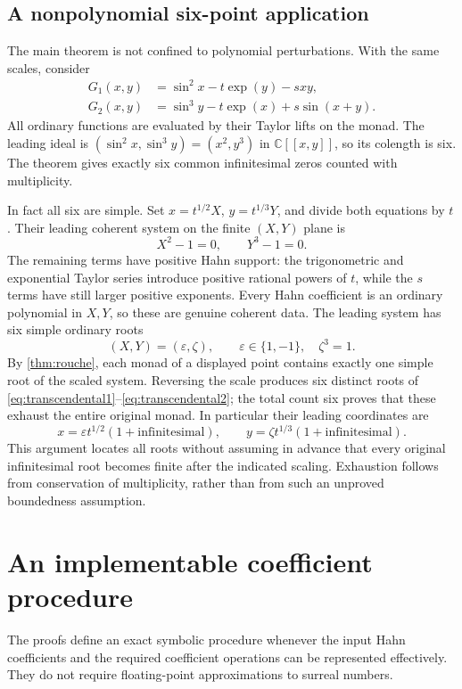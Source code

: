 \documentclass[11pt,letterpaper]{article}
\theoremstyle{definition}
\theoremstyle{remark}
\newcommand{\C}{\mathbb C}
\numberwithin{equation}{section}
\begin{document}
\subsection{A nonpolynomial six-point application}
The main theorem is not confined to polynomial perturbations. With the same scales, consider
\begin{align}
 G_1(x,y)&=\sin^2x-t\exp(y)-sxy,\label{eq:transcendental1}\\
 G_2(x,y)&=\sin^3y-t\exp(x)+s\sin(x+y).\label{eq:transcendental2}
\end{align}
All ordinary functions are evaluated by their Taylor lifts on the monad. The leading ideal is $(\sin^2x,\sin^3y)=(x^2,y^3)$ in $\C[[x,y]]$, so its colength is six. The theorem gives exactly six common infinitesimal zeros counted with multiplicity.

In fact all six are simple. Set $x=t^{1/2}X$, $y=t^{1/3}Y$, and divide both equations by $t$. Their leading coherent system on the finite $(X,Y)$ plane is
\[
 X^2-1=0,\qquad Y^3-1=0.
\]
The remaining terms have positive Hahn support: the trigonometric and exponential Taylor series introduce positive rational powers of $t$, while the $s$ terms have still larger positive exponents. Every Hahn coefficient is an ordinary polynomial in $X,Y$, so these are genuine coherent data. The leading system has six simple ordinary roots
\[
 (X,Y)=(\varepsilon,\zeta),\qquad
 \varepsilon\in\{1,-1\},\quad\zeta^3=1.
\]
By \cref{thm:rouche}, each monad of a displayed point contains exactly one simple root of the scaled system. Reversing the scale produces six distinct roots of \eqref{eq:transcendental1}--\eqref{eq:transcendental2}; the total count six proves that these exhaust the entire original monad. In particular their leading coordinates are
\[
 x=\varepsilon t^{1/2}(1+\text{infinitesimal}),\qquad
 y=\zeta t^{1/3}(1+\text{infinitesimal}).
\]
This argument locates all roots without assuming in advance that every original infinitesimal root becomes finite after the indicated scaling. Exhaustion follows from conservation of multiplicity, rather than from such an unproved boundedness assumption.

\section{An implementable coefficient procedure}\label{sec:algorithm}
The proofs define an exact symbolic procedure whenever the input Hahn coefficients and the required coefficient operations can be represented effectively. They do not require floating-point approximations to surreal numbers.
\end{document}
